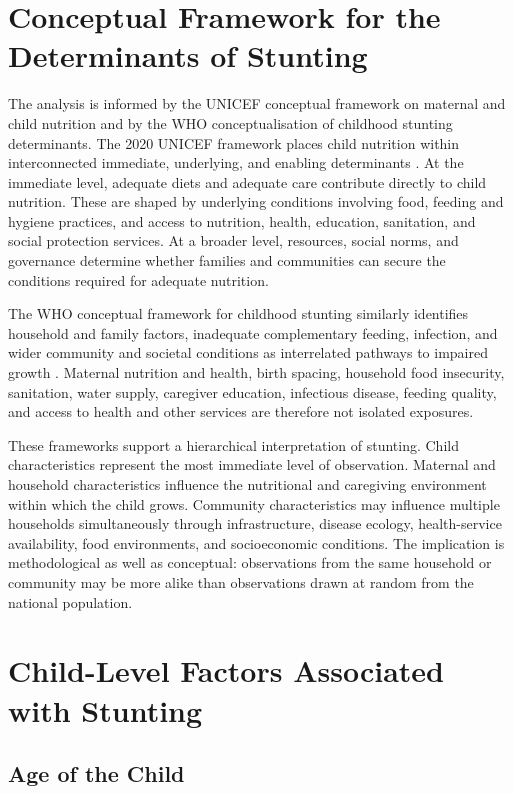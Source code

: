 \section{Conceptual Framework for the Determinants of Stunting}

The analysis is informed by the UNICEF conceptual framework on maternal and child nutrition and by the WHO conceptualisation of childhood stunting determinants. The 2020 UNICEF framework places child nutrition within interconnected immediate, underlying, and enabling determinants \cite{UNICEF2020}. At the immediate level, adequate diets and adequate care contribute directly to child nutrition. These are shaped by underlying conditions involving food, feeding and hygiene practices, and access to nutrition, health, education, sanitation, and social protection services. At a broader level, resources, social norms, and governance determine whether families and communities can secure the conditions required for adequate nutrition.

The WHO conceptual framework for childhood stunting similarly identifies household and family factors, inadequate complementary feeding, infection, and wider community and societal conditions as interrelated pathways to impaired growth \cite{WHOFramework2013}. Maternal nutrition and health, birth spacing, household food insecurity, sanitation, water supply, caregiver education, infectious disease, feeding quality, and access to health and other services are therefore not isolated exposures.

These frameworks support a hierarchical interpretation of stunting. Child characteristics represent the most immediate level of observation. Maternal and household characteristics influence the nutritional and caregiving environment within which the child grows. Community characteristics may influence multiple households simultaneously through infrastructure, disease ecology, health-service availability, food environments, and socioeconomic conditions. The implication is methodological as well as conceptual: observations from the same household or community may be more alike than observations drawn at random from the national population.

\section{Child-Level Factors Associated with Stunting}

\subsection{Age of the Child}

